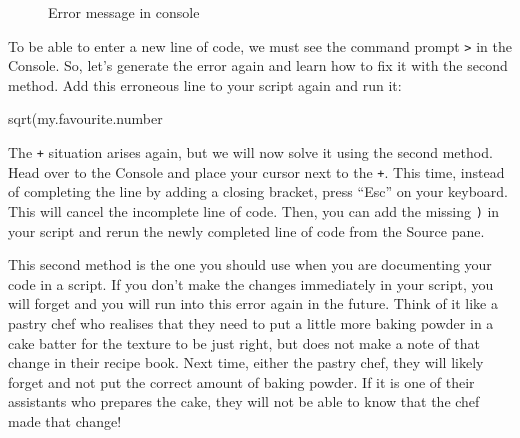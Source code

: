 \documentclass[
  letterpaper,
  DIV=11,
  numbers=noendperiod,
  oneside]{scrreprt}
\newenvironment{Shaded}{\begin{snugshade}}{\end{snugshade}}
\newcommand{\FunctionTok}[1]{\textcolor[rgb]{0.28,0.35,0.67}{#1}}
\newcommand{\NormalTok}[1]{\textcolor[rgb]{0.00,0.23,0.31}{#1}}
\begin{document}
\begin{figure}


\caption{\label{fig-ConsoleError}Error message in console}

\end{figure}%

To be able to enter a new line of code, we must see the command prompt
\texttt{\textgreater{}} in the Console. So, let's generate the error
again and learn how to fix it with the second method. Add this erroneous
line to your script again and run it:

\begin{Shaded}
\begin{Highlighting}[]
\FunctionTok{sqrt}\NormalTok{(my.favourite.number}
\end{Highlighting}
\end{Shaded}

The \texttt{+} situation arises again, but we will now solve it using
the second method. Head over to the Console and place your cursor next
to the \texttt{+}. This time, instead of completing the line by adding a
closing bracket, press ``Esc'' on your keyboard. This will cancel the
incomplete line of code. Then, you can add the missing \texttt{)} in
your script and rerun the newly completed line of code from the Source
pane.

This second method is the one you should use when you are documenting
your code in a script. If you don't make the changes immediately in your
script, you will forget and you will run into this error again in the
future. Think of it like a pastry chef who realises that they need to
put a little more baking powder in a cake batter for the texture to be
just right, but does not make a note of that change in their recipe
book. Next time, either the pastry chef, they will likely forget and not
put the correct amount of baking powder. If it is one of their
assistants who prepares the cake, they will not be able to know that the
chef made that change!
\end{document}
